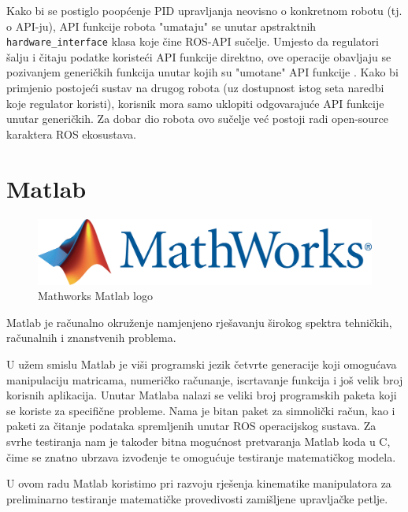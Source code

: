 \documentclass[times, utf8, diplomski, numeric]{fer}
\begin{document}
Kako bi se postiglo poopćenje PID upravljanja neovisno o konkretnom robotu (tj. o API-ju), API funkcije robota "umataju" se unutar apstraktnih \texttt{hardware\_interface} klasa koje čine ROS-API sučelje.
Umjesto da regulatori šalju i čitaju podatke koristeći API funkcije direktno, ove operacije obavljaju se pozivanjem generičkih funkcija unutar kojih su "umotane" API funkcije .
Kako bi primjenio postojeći sustav na drugog robota (uz dostupnost istog seta naredbi koje regulator koristi), korisnik mora samo uklopiti odgovarajuće API funkcije unutar generičkih.
Za dobar dio robota ovo sučelje već postoji radi open-source karaktera ROS ekosustava.


\section{Matlab}
\begin{figure}[h!]
\centering
\includegraphics[scale=0.3]{logo_mathworks}
\caption{Mathworks Matlab logo}
\end{figure}
Matlab je računalno okruženje namjenjeno rješavanju širokog spektra tehničkih, računalnih i znanstvenih problema.

U užem smislu Matlab je viši programski jezik četvrte generacije koji omogućava manipulaciju matricama, numeričko računanje, iscrtavanje funkcija i još velik broj korisnih aplikacija.
Unutar Matlaba nalazi se veliki broj programskih paketa koji se koriste za specifične probleme.
Nama je bitan paket za simnolički račun, kao i paketi za čitanje podataka spremljenih unutar ROS operacijskog sustava.
Za svrhe testiranja nam je također bitna mogućnost pretvaranja Matlab koda u C, čime se znatno ubrzava izvođenje te omogućuje testiranje matematičkog modela.

U ovom radu Matlab koristimo pri razvoju rješenja kinematike manipulatora za preliminarno testiranje matematičke provedivosti zamišljene upravljačke petlje.
\end{document}
